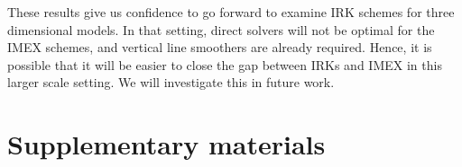 \documentclass[a4paper, 12pt]{article}
\newcommand{\checkit}[1]{{\color{red}#1}}
\begin{document}
These results give us confidence to go forward to examine IRK schemes
for three dimensional models. In that setting, direct solvers will not
be optimal for the IMEX schemes, and vertical line smoothers are
already required. Hence, it is possible that it will be easier to
close the gap between IRKs and IMEX in this larger scale setting. We
will investigate this in future work.







\appendix

\section{Supplementary materials}
\end{document}
